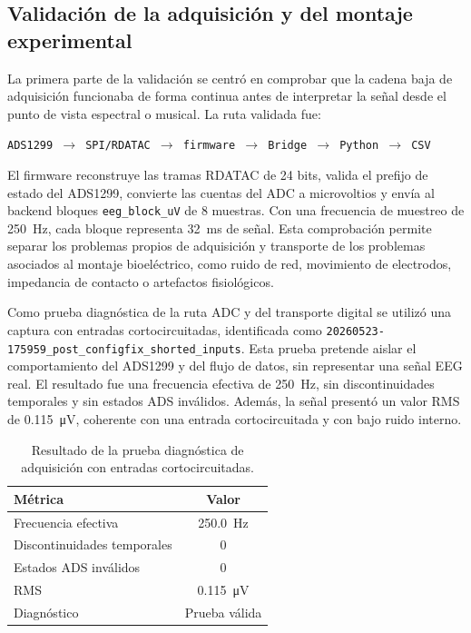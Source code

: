 \subsection{Validación de la adquisición y del montaje experimental}
\label{subsec:validacion_adquisicion_montaje}

La primera parte de la validación se centró en comprobar que la cadena baja de adquisición funcionaba de forma continua antes de interpretar la señal desde el punto de vista espectral o musical. La ruta validada fue:

\begin{center}
\texttt{ADS1299 $\rightarrow$ SPI/RDATAC $\rightarrow$ firmware $\rightarrow$ Bridge $\rightarrow$ Python $\rightarrow$ CSV}
\end{center}

El firmware reconstruye las tramas RDATAC de 24 bits, valida el prefijo de estado del ADS1299, convierte las cuentas del ADC a microvoltios y envía al backend bloques \texttt{eeg\_block\_uV} de 8 muestras. Con una frecuencia de muestreo de \SI{250}{\hertz}, cada bloque representa \SI{32}{\milli\second} de señal. Esta comprobación permite separar los problemas propios de adquisición y transporte de los problemas asociados al montaje bioeléctrico, como ruido de red, movimiento de electrodos, impedancia de contacto o artefactos fisiológicos.

Como prueba diagnóstica de la ruta ADC y del transporte digital se utilizó una captura con entradas cortocircuitadas, identificada como \texttt{20260523-175959\_post\_configfix\_shorted\_inputs}. Esta prueba pretende aislar el comportamiento del ADS1299 y del flujo de datos, sin representar una señal EEG real. El resultado fue una frecuencia efectiva de \SI{250}{\hertz}, sin discontinuidades temporales y sin estados ADS inválidos. Además, la señal presentó un valor RMS de \SI{0.115}{\micro\volt}, coherente con una entrada cortocircuitada y con bajo ruido interno.

\begin{table}[!htbp]
    \centering
    \caption{Resultado de la prueba diagnóstica de adquisición con entradas cortocircuitadas.}
    \label{tab:validacion_shorted_inputs}
    \begin{tabular}{l c}
        \hline
        \textbf{Métrica} & \textbf{Valor} \\
        \hline
        Frecuencia efectiva & \SI{250.0}{\hertz} \\
        Discontinuidades temporales & 0 \\
        Estados ADS inválidos & 0 \\
        RMS & \SI{0.115}{\micro\volt} \\
        Diagnóstico & Prueba válida \\
        \hline
    \end{tabular}
\end{table}

